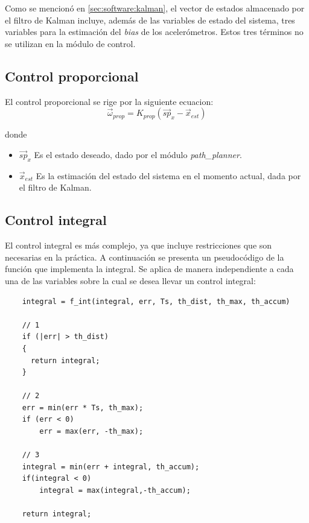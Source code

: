 \documentclass[main]{subfiles}
\begin{document}
Como se mencion\'o en \ref{sec:software:kalman}, el vector de estados almacenado por el filtro de Kalman incluye, adem\'as de las variables de estado del sistema, tres variables para la estimaci\'on del \textit{bias} de los aceler\'ometros. Estos tres t\'erminos no se utilizan en la m\'odulo de control.

\subsection{Control proporcional}
\label{sec:software:control-prop}


El control proporcional se rige por la siguiente ecuacion:
\begin{equation}
  \label{eq:software:prop}
  \vec{\omega}_{prop} = K_{prop} (\vec{sp}_x - \vec{x}_{est})
\end{equation}

donde
\begin{itemize}
\item $\vec{sp}_x$ Es el estado deseado, dado por el m\'odulo \textit{path\_planner}.
\item $\vec{x}_{est}$ Es la estimaci\'on del estado del sistema en el momento actual, dada por el filtro de Kalman.
\end{itemize}

\subsection{Control integral}
\label{sec:software:control-int}

El control integral es m\'as complejo, ya que incluye restricciones que son necesarias en la pr\'actica. A continuaci\'on se presenta un pseudoc\'odigo de la funci\'on que implementa la integral. Se aplica de manera independiente a cada una de las variables sobre la cual se desea llevar un control integral:
\begin{verbatim}
    integral = f_int(integral, err, Ts, th_dist, th_max, th_accum)

    // 1
    if (|err| > th_dist)
    {
      return integral;
    }

    // 2
    err = min(err * Ts, th_max);
    if (err < 0)
        err = max(err, -th_max);

    // 3
    integral = min(err + integral, th_accum);
    if(integral < 0)
        integral = max(integral,-th_accum);

    return integral;
\end{verbatim}
\end{document}
